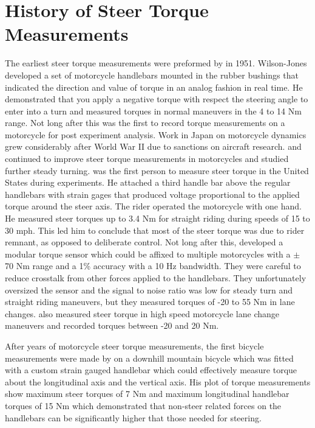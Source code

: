 \documentclass[a4paper]{article}
\begin{document}
\section*{History of Steer Torque Measurements}

The earliest steer torque measurements were preformed by
\cite{Wilson-Jones1951} in 1951. Wilson-Jones developed a set of motorcycle
handlebars mounted in the rubber bushings that indicated the direction and
value of torque in an analog fashion in real time. He demonstrated that you
apply a negative torque with respect the steering angle to enter into a turn
and measured torques in normal maneuvers in the 4 to 14 Nm range. Not long
after this \cite{Kondo1955} was the first to record torque measurements on a
motorcycle for post experiment analysis. Work in Japan on motorcycle dynamics
grew considerably after World War II due to sanctions on aircraft research.
\cite{Kageyama1959} and \cite{Fu1965} continued to improve steer torque
measurements in motorcycles and studied further steady turning.
\cite{Eaton1973} was the first person to measure steer torque in the United
States during experiments. He attached a third handle bar above the regular
handlebars with strain gages that produced voltage proportional to the applied
torque around the steer axis. The rider operated the motorcycle with one hand.
He measured steer torques up to 3.4 Nm for straight riding during speeds of 15
to 30 mph. This led him to conclude that most of the steer torque was due to
rider remnant, as opposed to deliberate control. Not long after this,
\cite{Weir1979a} developed a modular torque sensor which could be affixed to
multiple motorcycles with a $\pm$ 70 Nm range and a 1\% accuracy with a 10 Hz
bandwidth. They were careful to reduce crosstalk from other forces applied to
the handlebars. They unfortunately oversized the sensor and the signal to noise
ratio was low for steady turn and straight riding maneuvers, but they measured
torques of -20 to 55 Nm in lane changes. \cite{Sugizaki} also measured steer
torque in high speed motorcycle lane change maneuvers and recorded torques
between -20 and 20 Nm.

After years of motorcycle steer torque measurements, the first bicycle
measurements were made by \cite{Lorenzo1997} on a downhill mountain bicycle
which was fitted with a custom strain gauged handlebar which could effectively
measure torque about the longitudinal axis and the vertical axis. His plot of
torque measurements show maximum steer torques of 7 Nm and maximum longitudinal
handlebar torques of 15 Nm which demonstrated that non-steer related forces on
the handlebars can be significantly higher that those needed for steering.
\end{document}
